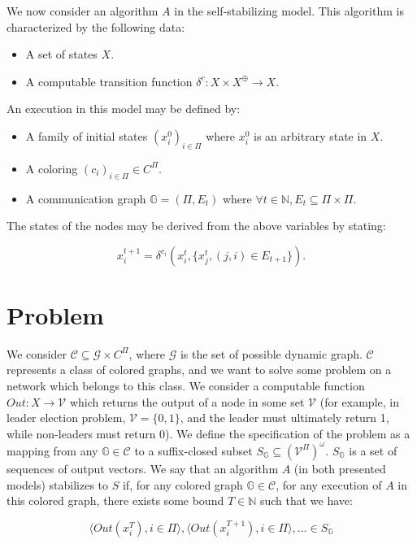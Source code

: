 \documentclass[11pt,letterpaper]{article}
\begin{document}
We now consider an algorithm $A$ in the self-stabilizing model.
This algorithm is characterized by the following data:

\begin{itemize}
	\item A set of states $X$.
	\item A computable transition function $\delta^c : X \times X^\oplus \rightarrow X$.
\end{itemize}

\noindent An execution in this model may be defined by:
\begin{itemize}
	\item A family of initial states $(x_i^0)_{i \in \Pi}$ where $x_i^0$ is an arbitrary state in $X$.
	\item A coloring $(c_i)_{i \in \Pi} \in C^\Pi$.
	\item A communication graph $\mathds{G} = (\Pi, E_t)$ where $\forall t \in \mathds{N}, E_t \subseteq \Pi \times \Pi$.
\end{itemize}

The states of the nodes may be derived from the above variables by stating:

$$x_i^{t+1} = \delta^{c_i}(x_i^t, \{x_j^t, (j,i) \in E_{t+1}\}).$$

\section{Problem}

We consider $\mathcal{C} \subseteq \mathcal{G} \times C^\Pi$, where $\mathcal{G}$ is the set of possible dynamic graph.
$\mathcal{C}$ represents a class of colored graphs, and we want to solve some problem on a network which belongs to this class.
We consider a computable function $Out : X \rightarrow \mathcal{V}$ which returns the output of a node in some set $\mathcal{V}$
(for example, in leader election problem, $\mathcal{V} = \{0,1\}$, and the leader must ultimately return 1, while non-leaders must return 0).
We define the specification of the problem as a mapping from any $\mathds{G} \in \mathcal{C}$ to a suffix-closed subset $S_\mathds{G} \subseteq (\mathcal{V}^\Pi)^\omega$.
$S_\mathds{G}$ is a set of sequences of output vectors.
We say that an algorithm $A$ (in both presented models) stabilizes to $S$ if, for any colored graph $\mathds{G} \in \mathcal{C}$,
for any execution of $A$ in this colored graph, there exists some bound $T \in \mathds{N}$ such that we have:

$$\langle Out(x^T_i), i \in \Pi \rangle, \langle Out(x^{T+1}_i), i \in \Pi \rangle, \dots \in S_\mathds{G}$$
\end{document}
